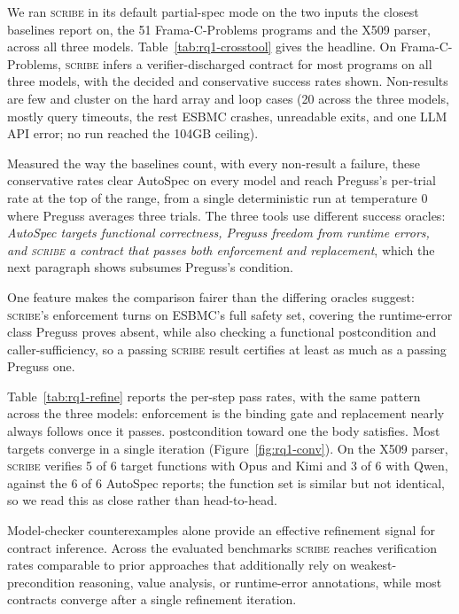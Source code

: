 \documentclass[conference]{IEEEtran}
\theoremstyle{definition}
\theoremstyle{remark}
\begin{document}
We ran \textsc{scribe} in its
default partial-spec mode on the two inputs the closest baselines report on,
the 51 Frama-C-Problems programs and the X509 parser, across all three
models. Table~\ref{tab:rq1-crosstool} gives the headline. On
Frama-C-Problems, \textsc{scribe} infers a verifier-discharged contract for
most programs on all three models, with the decided and conservative
success rates shown.
Non-results are few and cluster on the hard array and loop cases
(20 across the three models, mostly query timeouts, the rest ESBMC crashes,
unreadable exits, and one LLM API error; no run reached the 104GB ceiling).

Measured the way the baselines count, with every non-result a failure, these
conservative rates clear AutoSpec on every model and reach Preguss's
per-trial rate at the top of the range, from a single deterministic run at
temperature $0$ where Preguss averages three trials. The three tools use
different success oracles: \textit{AutoSpec targets functional
  correctness, Preguss
  freedom from runtime errors, and \textsc{scribe} a contract that passes both
enforcement and replacement}, which the next paragraph shows subsumes
Preguss's condition.

One feature makes the comparison fairer than the differing oracles suggest:
\textsc{scribe}'s enforcement turns on ESBMC's full safety set, covering the
runtime-error class Preguss proves absent, while also checking a functional
postcondition and caller-sufficiency, so a passing \textsc{scribe} result
certifies at least as much as a passing Preguss one.

Table~\ref{tab:rq1-refine} reports the per-step pass rates, with the same
pattern across the three models: enforcement is the binding gate and
replacement nearly always follows once it passes.
postcondition toward one the body satisfies.
Most targets converge in a
single iteration (Figure~\ref{fig:rq1-conv}). On the
X509 parser, \textsc{scribe} verifies 5 of 6 target functions with Opus and
Kimi and 3 of 6 with Qwen, against the 6 of 6 AutoSpec reports; the function
set is similar but not identical, so we read this as close rather than
head-to-head.

\begin{tcolorbox}[mybox,title=RQ1 Answer]
  Model-checker counterexamples alone provide an effective refinement signal
  for contract inference. Across the evaluated benchmarks \textsc{scribe}
  reaches verification rates comparable to prior approaches that additionally
  rely on weakest-precondition reasoning, value analysis, or runtime-error
  annotations, while most contracts converge after a single refinement
  iteration.
\end{tcolorbox}
\end{document}

